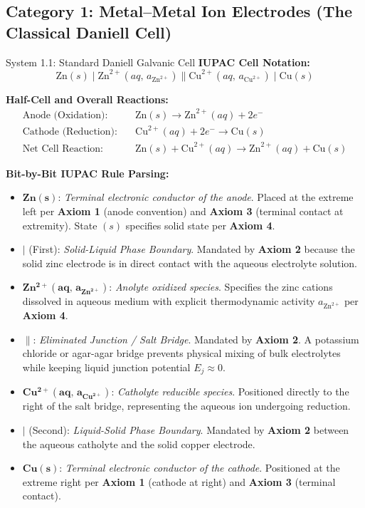 \documentclass[10pt,a4paper]{article}
\begin{document}
\subsection{Category 1: Metal--Metal Ion Electrodes (The Classical Daniell Cell)}
\begin{examplebox}{System 1.1: Standard Daniell Galvanic Cell}
\textbf{IUPAC Cell Notation:}
\begin{equation*}
    \text{Zn}(s) \mid \text{Zn}^{2+}(aq,\, a_{\text{Zn}^{2+}}) \parallel \text{Cu}^{2+}(aq,\, a_{\text{Cu}^{2+}}) \mid \text{Cu}(s)
\end{equation*}

\textbf{Half-Cell and Overall Reactions:}
\begin{align*}
    \text{Anode (Oxidation):} \quad & \text{Zn}(s) \longrightarrow \text{Zn}^{2+}(aq) + 2e^- \\
    \text{Cathode (Reduction):} \quad & \text{Cu}^{2+}(aq) + 2e^- \longrightarrow \text{Cu}(s) \\
    \text{Net Cell Reaction:} \quad & \text{Zn}(s) + \text{Cu}^{2+}(aq) \longrightarrow \text{Zn}^{2+}(aq) + \text{Cu}(s)
\end{align*}

\textbf{Bit-by-Bit IUPAC Rule Parsing:}
\begin{itemize}[leftmargin=*]
    \item $\mathbf{Zn(s)}$: \textit{Terminal electronic conductor of the anode}. Placed at the extreme left per \textbf{Axiom 1} (anode convention) and \textbf{Axiom 3} (terminal contact at extremity). State $(s)$ specifies solid state per \textbf{Axiom 4}.
    \item $\mathbf{\mid}$ (First): \textit{Solid-Liquid Phase Boundary}. Mandated by \textbf{Axiom 2} because the solid zinc electrode is in direct contact with the aqueous electrolyte solution.
    \item $\mathbf{Zn^{2+}(aq,\, a_{\text{Zn}^{2+}})}$: \textit{Anolyte oxidized species}. Specifies the zinc cations dissolved in aqueous medium with explicit thermodynamic activity $a_{\text{Zn}^{2+}}$ per \textbf{Axiom 4}.
    \item $\mathbf{\parallel}$: \textit{Eliminated Junction / Salt Bridge}. Mandated by \textbf{Axiom 2}. A potassium chloride or agar-agar bridge prevents physical mixing of bulk electrolytes while keeping liquid junction potential $E_j \approx 0$.
    \item $\mathbf{Cu^{2+}(aq,\, a_{\text{Cu}^{2+}})}$: \textit{Catholyte reducible species}. Positioned directly to the right of the salt bridge, representing the aqueous ion undergoing reduction.
    \item $\mathbf{\mid}$ (Second): \textit{Liquid-Solid Phase Boundary}. Mandated by \textbf{Axiom 2} between the aqueous catholyte and the solid copper electrode.
    \item $\mathbf{Cu(s)}$: \textit{Terminal electronic conductor of the cathode}. Positioned at the extreme right per \textbf{Axiom 1} (cathode at right) and \textbf{Axiom 3} (terminal contact).
\end{itemize}
\end{examplebox}
\end{document}
